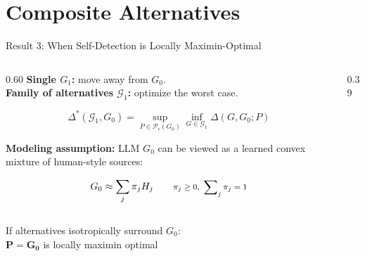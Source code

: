 \documentclass[aspectratio=169, 10pt]{beamer}
\newcommand{\bigDelta}{\Delta}
\newcommand{\cP}{\mathcal{P}}
\newcommand{\cG}{\mathcal{G}}
\begin{document}
\section{Composite Alternatives}
\begin{frame}[t]{Result 3: When Self-Detection is Locally Maximin-Optimal}
  \vspace{1.2em}
  \begin{columns}[c,onlytextwidth]
    \begin{column}{0.60\textwidth}
      {\small
      \textbf{Single \(G_1\):} move away from \(G_0\).\\[0.25em]
      \textbf{Family of alternatives \(\cG_1\):} optimize the worst case.}

      \[
        \bigDelta^*(\cG_1,G_0)=
        \sup_{P\in\cP_\epsilon(G_0)}\inf_{G\in\cG_1}\bigDelta(G,G_0;P)
      \]

      \vspace{0.5em}
      {\small \textbf{Modeling assumption:} LLM \(G_0\) can be viewed as a learned
      convex mixture of human-style sources:}

      \[
        G_0 \approx \sum_j \pi_j H_j
        \qquad \text{\footnotesize\(\pi_j\ge 0,\ \sum\nolimits_j \pi_j=1\)}
      \]
    \end{column}
    \hfill
    \begin{column}{0.39\textwidth}
      \centering
    \end{column}
  \end{columns}

  \vspace{0.15em}
  \begin{callout}[width=0.92\linewidth]
    {\small If alternatives \alert{isotropically surround} \(G_0\):}\\[2pt]
    {\Large \(\boldsymbol{P=G_0}\) is locally maximin optimal}
  \end{callout}
\end{frame}
\end{document}
